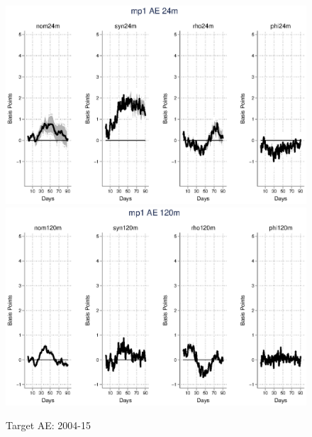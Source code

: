 \documentclass{article}
\begin{document}
\begin{figure}[tbph]
\begin{center}
	\end{center}
\end{figure}

\pagebreak[4]

\begin{figure}[tbph]
	\begin{center}
		\caption{Target AE: 2004-15}
		\includegraphics[trim={0cm 0cm 0cm 0cm},clip,height=0.5\textheight,width=1\textwidth]{../LagDep-FX/Target/AE/TargetAE24m.eps} \\
		\includegraphics[trim={0cm 0cm 0cm 0cm},clip,height=0.5\textheight,width=1\textwidth]{../LagDep-FX/Target/AE/TargetAE120m.eps} \\
	\end{center}
\end{figure}
\end{document}
